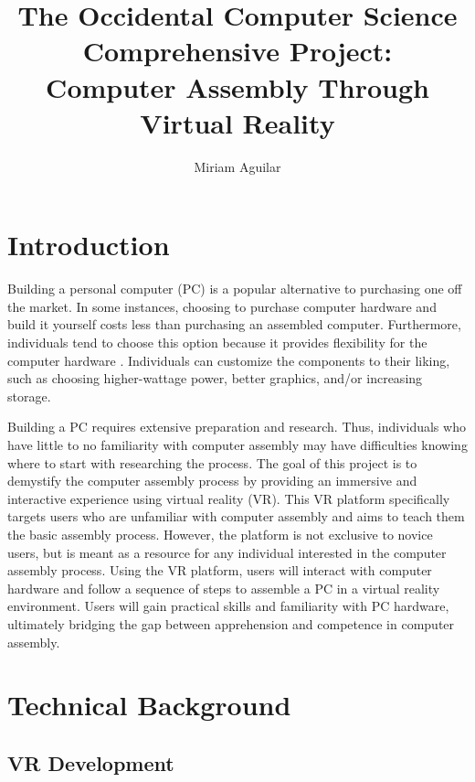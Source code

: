 \documentclass[10pt,twocolumn]{article}
\title{The Occidental Computer Science Comprehensive Project: \\ Computer Assembly Through Virtual Reality}
\author{Miriam Aguilar}
\affiliation{Occidental College}
\begin{document}
\maketitle

\section{Introduction}

\par Building a personal computer (PC) is a popular alternative to purchasing one off the market. In some instances, choosing to purchase computer hardware and build it yourself costs less than purchasing an assembled computer. Furthermore, individuals tend to choose this option because it provides flexibility for the computer hardware \cite{Beltran2022BuildingYourOwn}. Individuals can customize the components to their liking, such as choosing higher-wattage power, better graphics, and/or increasing storage. 

\par Building a PC requires extensive preparation and research. Thus, individuals who have little to no familiarity with computer assembly may have difficulties knowing where to start with researching the process. The goal of this project is to demystify the computer assembly process by providing an immersive and interactive experience using virtual reality (VR). This VR platform specifically targets users who are unfamiliar with computer assembly and aims to teach them the basic assembly process. However, the platform is not exclusive to novice users, but is meant as a resource for any individual interested in the computer assembly process. Using the VR platform, users will interact with computer hardware and follow a sequence of steps to assemble a PC in a virtual reality environment. Users will gain practical skills and familiarity with PC hardware, ultimately bridging the gap between apprehension and competence in computer assembly. 

\section{Technical Background}

\subsection{VR Development}
\end{document}

